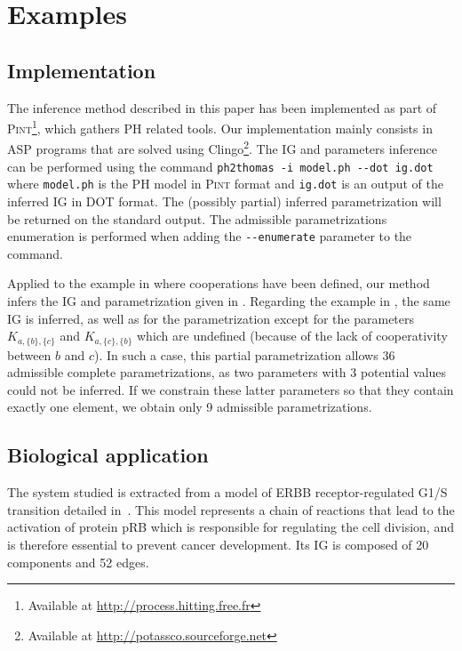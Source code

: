 \section{Examples}\label{sec:examples}


\subsection{Implementation}

The inference method described in this paper has been implemented as part of
\textsc{Pint}\footnote{Available at \url{http://process.hitting.free.fr}}, which gathers PH related
tools.
Our implementation mainly consists in ASP programs that are solved using Clingo\footnote{Available
at \url{http://potassco.sourceforge.net}}.
The IG and parameters inference can be performed using the command
\texttt{ph2thomas -i model.ph -{}-dot ig.dot}
where \texttt{model.ph} is the PH model in \textsc{Pint} format and \texttt{ig.dot} is an output of the inferred IG in DOT format.
The (possibly partial) inferred parametrization will be returned on the standard output.
The admissible parametrizations enumeration is performed when adding the \texttt{-{}-enumerate}
parameter to the command.

Applied to the example in  where cooperations have been defined,
our method infers the IG and parametrization given in .
Regarding the example in , the same IG is inferred, as well as for the
parametrization except for the parameters $K_{a,\{b\},\{c\}}$ and $K_{a,\{c\},\{b\}}$ which are
undefined (because of the lack of cooperativity between $b$ and $c$).
In such a case, this partial parametrization allows 36 admissible complete parametrizations, as two
parameters with 3 potential values could not be inferred.
If we constrain these latter parameters so that they contain exactly one element, we obtain only 9
admissible parametrizations.



\subsection{Biological application}

The system studied is extracted from a model of ERBB receptor-regulated G1/S transition detailed in~\cite{Sahin09}.
This model represents a chain of reactions that lead to the activation of protein pRB which is responsible for regulating the cell division,
and is therefore essential to prevent cancer development.
Its IG is composed of 20 components and 52 edges.

